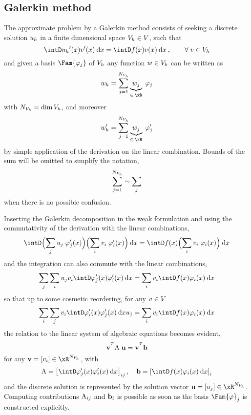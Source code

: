 \subsection{Galerkin method}

The approximate problem by a Galerkin method consists of seeking a discrete solution ${u_h}$ in a finite dimensional space ${{V}}_h \in {V}$, such that
\begin{equation*}
\intD \uh'(x) v'(x) \md x = \intD f(x) v(x) \md x\:,\qquad\forany v \in \xVh
\end{equation*}
and given a basis $\Fam{\varphi_j}$ of ${{V}}_h$ any function $w\in{{V}}_h$ can be written as
\begin{equation*}
w_h = \sum_{j=1}^{\NxVh} \underbrace{w_j}_{\in\,\xR}\;\varphi_j
\end{equation*}
with ${N_{{{V}}_h}} = \dim{{{V}}_h}$, and moreover
\begin{equation*}
w'_h = \sum_{j=1}^{\NxVh} \underbrace{w_j}_{\in\,\xR}\;\varphi'_j
\end{equation*}
by simple application of the derivation on the linear combination.
Bounds of the sum will be omitted to simplify the notation,
\begin{equation*}
\sum_{j=1}^{{N_{{{V}}_h}}} \sim \sum_{j}
\end{equation*}
 when there is no possible confusion.

\medskip
Inserting the Galerkin decomposition in the weak formulation and using the commutativity of the derivation with the linear combinations,
\begin{equation*}
\intD \Bigl(\sum_{j} u_j\;\varphi'_j(x)\Bigr) \Bigl(\sum_{i} v_i\;\varphi'_i(x)\Bigr) \md x = \intD f(x) \Bigl(\sum_{i} v_i\;\varphi_i(x)\Bigr) \md x
\end{equation*}
and the integration can also commute with the linear combinations,
\begin{equation*}
\sum_{j} \sum_{i} u_j v_i \intD \varphi'_j(x)\varphi'_i(x) \md x = \sum_{i} v_i\intD f(x) \varphi_i(x) \md x
\end{equation*}
so that up to some cosmetic reordering, for any $v \in {V}$
\begin{equation*}
\sum_{i}  \sum_{j} v_i \intD \varphi'_i(x)\varphi'_j(x) \md x u_j = \sum_{i} v_i\intD f(x) \varphi_i(x) \md x
\end{equation*}
the relation to the linear system of algebraic equations becomes evident,
\begin{equation*}
\vecv^\trans \matA\;\vecu = \vecv^\trans \vecb
\end{equation*}
for any $\vecv = [v_i]\in \xR^\NxVh$, with
\begin{equation*}
\matA = \left[\intD \varphi'_j(x)\varphi'_i(x) \md x\right]_{ij},\quad\vecb = \left[\intD f(x) \varphi_i(x) \md x\right]_{i}
\end{equation*}
and the discrete solution is represented by the solution vector $\vecu = [u_j]\in \xR^\NxVh$.
Computing contributions ${\mathrm A}_{ij}$ and $\mathbf b_i$ is possible as soon as the basis $\Fam{\varphi}_j$ is constructed explicitly.

